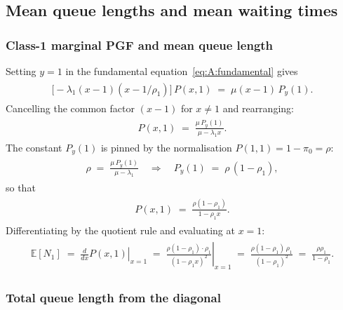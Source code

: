 \subsection{Mean queue lengths and mean waiting times}

\subsubsection{Class-1 marginal PGF and mean queue length}

Setting $y=1$ in the fundamental equation~\eqref{eq:A:fundamental} gives
\begin{align}
    \begin{split}
        \bigl[-\lambda_1(x-1)(x-1/\rho_1)\bigr]\,P(x,1)
        \;=\; \mu(x-1)\,P_y(1).
    \end{split}
\end{align}
Cancelling the common factor $(x-1)$ for $x\neq1$ and rearranging:
\begin{align}
    \begin{split}
        P(x,1) \;=\; \frac{\mu\,P_y(1)}{\mu-\lambda_1 x}.
    \end{split}
    \label{eq:A:Px1}
\end{align}
The constant $P_y(1)$ is pinned by the normalisation $P(1,1)=1-\pi_0=\rho$:
\begin{align}
    \begin{split}
        \rho \;=\; \frac{\mu\,P_y(1)}{\mu-\lambda_1}
        \quad\Longrightarrow\quad
        P_y(1) \;=\; \rho\,(1-\rho_1),
    \end{split}
    \label{eq:A:Py1}
\end{align}
so that
\begin{align}
    \begin{split}
        P(x,1) \;=\; \frac{\rho(1-\rho_1)}{1-\rho_1 x}.
    \end{split}
\end{align}
Differentiating by the quotient rule and evaluating at $x=1$:
\begin{align}
    \begin{split}
        \mathbb{E}[N_1]
        \;=\; \left.\frac{d}{dx}P(x,1)\right|_{x=1}
        \;=\; \left.\frac{\rho(1-\rho_1)\cdot\rho_1}{(1-\rho_1 x)^2}\right|_{x=1}
        \;=\; \frac{\rho(1-\rho_1)\,\rho_1}{(1-\rho_1)^2}
        \;=\; \frac{\rho\rho_1}{1-\rho_1}.
    \end{split}
    \label{eq:A:EN1}
\end{align}

\subsubsection{Total queue length from the diagonal}


